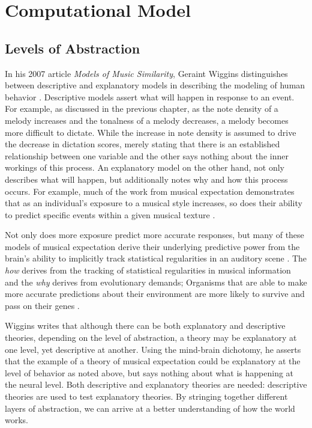 \documentclass[12pt,]{book}
\begin{document}
\hypertarget{computational-model}{%
\chapter{Computational Model}\label{computational-model}}

\hypertarget{levels-of-abstraction}{%
\section{Levels of Abstraction}\label{levels-of-abstraction}}

In his 2007 article \emph{Models of Music Similarity}, Geraint Wiggins distinguishes between descriptive and explanatory models in describing the modeling of human behavior \citep{wigginsModelsMusicalSimilarity2007}.
Descriptive models assert what will happen in response to an event.
For example, as discussed in the previous chapter, as the note density of a melody increases and the tonalness of a melody decreases, a melody becomes more difficult to dictate.
While the increase in note density is assumed to drive the decrease in dictation scores, merely stating that there is an established relationship between one variable and the other says nothing about the inner workings of this process.
An explanatory model on the other hand, not only describes what will happen, but additionally notes why and how this process occurs.
For example, much of the work from musical expectation demonstrates that as an individual's exposure to a musical style increases, so does their ability to predict specific events within a given musical texture \citep{pearceStatisticalLearningProbabilistic2018a}.

Not only does more exposure predict more accurate responses, but many of these models of musical expectation derive their underlying predictive power from the brain's ability to implicitly track statistical regularities in an auditory scene \citep{saffranStatisticalLearningTone1999, margulisRepeatHowMusic2014}.
The \emph{how} derives from the tracking of statistical regularities in musical information and the \emph{why} derives from evolutionary demands; Organisms that are able to make more accurate predictions about their environment are more likely to survive and pass on their genes \citep{huronSweetAnticipation2006}.

Wiggins writes that although there can be both explanatory and descriptive theories, depending on the level of abstraction, a theory may be explanatory at one level, yet descriptive at another.
Using the mind-brain dichotomy, he asserts that the example of a theory of musical expectation could be explanatory at the level of behavior as noted above, but says nothing about what is happening at the neural level.
Both descriptive and explanatory theories are needed: descriptive theories are used to test explanatory theories.
By stringing together different layers of abstraction, we can arrive at a better understanding of how the world works.
\end{document}
